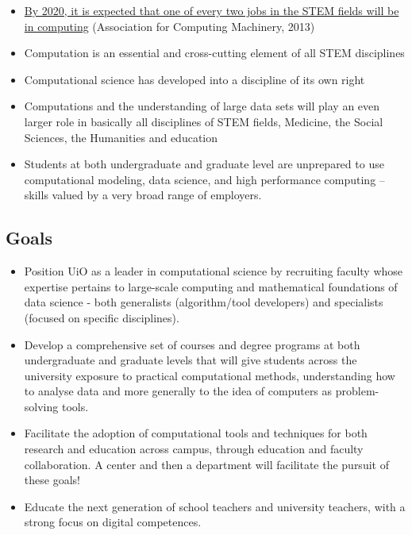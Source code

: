 \documentclass[%
oneside,                 %
final,                   %
10pt]{article}
\begin{document}
\begin{itemize}
\item \href{{http://pathways.acm.org/executive-summary.html}}{By 2020, it is expected that one of every two jobs in the STEM fields will be in computing} (Association for Computing Machinery, 2013)

\item Computation is an essential and cross-cutting element of all STEM disciplines

\item Computational science has developed into a discipline of its own right

\item Computations and the understanding of large data sets will play an even larger role in basically all disciplines of STEM fields, Medicine, the Social Sciences, the Humanities and  education

\item Students at both undergraduate and graduate level are unprepared to use computational modeling, data science, and high performance computing – skills valued by a very broad range of employers.
\end{itemize}

\noindent
\subsection{Goals}

\begin{itemize}
\item Position UiO  as a leader in computational science by recruiting faculty whose expertise pertains to large-scale computing and mathematical foundations of data science - both generalists (algorithm/tool developers) and specialists (focused on specific disciplines).	

\item Develop a comprehensive set of courses and degree programs at both undergraduate and graduate levels that will give students across the university exposure to practical computational methods, understanding how to analyse data and more generally to the idea of computers as problem-solving tools.	

\item Facilitate the adoption of computational tools and techniques for both research and education across campus, through education and faculty collaboration. A center and then a department will facilitate the pursuit of these goals!	

\item Educate the next generation of school teachers and university teachers,  with a strong focus on digital competences. 
\end{itemize}
\end{document}
